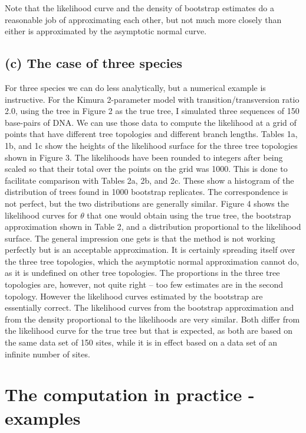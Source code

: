   Note that the
likelihood curve and the density of bootstrap estimates do a reasonable job of
approximating each other, but not much more closely
than either is approximated by the asymptotic normal curve.

\subsection*{(c) The case of three species}

For three species we can do less analytically, but a numerical example is
instructive.  For the Kimura 2-parameter model with transition/transversion
ratio 2.0, using the tree in Figure 2 as the true tree, I simulated
three sequences of 150 base-pairs of DNA.  We can use those data to
compute the likelihood at a grid of points that have different tree topologies
and different branch lengths. Tables 1a, 1b, and 1c show the heights of the likelihood
surface for the three tree topologies shown in Figure 3.  The likelihoods have
been rounded to integers after being scaled so that their total over the
points on the grid was 1000.  This is done to facilitate comparison with
Tables 2a, 2b, and 2c.  These show a histogram of the distribution of trees
found in 1000 bootstrap replicates.  The correspondence is not perfect, but
the two distributions are generally similar.  Figure 4 shows the likelihood
curves for $\theta$ that one would obtain using the true tree, the 
bootstrap approximation shown in Table 2, and a distribution proportional
to the likelihood surface.  The general impression
one gets is that the
method is not working perfectly but is an acceptable approximation.
It is certainly spreading itself over the three tree topologies, which
the asymptotic normal approximation cannot do, as it is undefined on other
tree topologies.  The proportions in the three tree topologies are, however,
not quite right -- too few estimates are in the second topology.  However
the likelihood curves estimated by the bootstrap are essentially correct.
The likelihood curves from the bootstrap approximation and from the density
proportional to the likelihoods are very similar.  Both differ from the
likelihood curve for the true tree but that is expected, as both are based
on the same data set of 150 sites, while it is in effect based on a data set
of an infinite number of sites.

\bigskip


\section{The computation in practice - examples}

